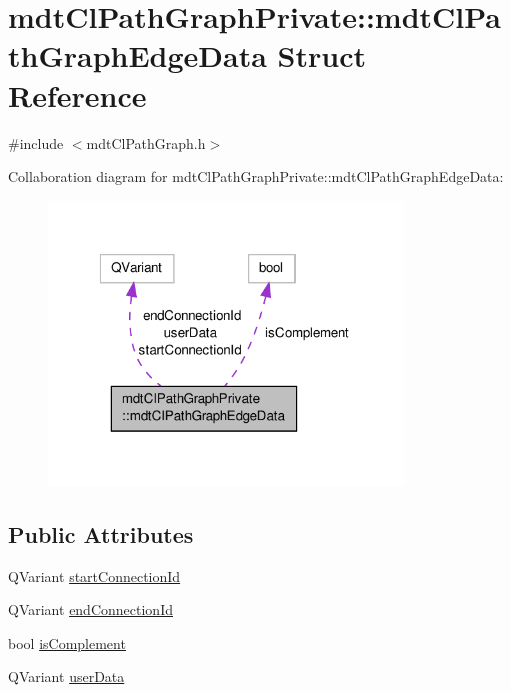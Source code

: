 \hypertarget{structmdt_cl_path_graph_private_1_1mdt_cl_path_graph_edge_data}{\section{mdt\-Cl\-Path\-Graph\-Private\-:\-:mdt\-Cl\-Path\-Graph\-Edge\-Data Struct Reference}
\label{structmdt_cl_path_graph_private_1_1mdt_cl_path_graph_edge_data}
}


{\ttfamily \#include $<$mdt\-Cl\-Path\-Graph.\-h$>$}



Collaboration diagram for mdt\-Cl\-Path\-Graph\-Private\-:\-:mdt\-Cl\-Path\-Graph\-Edge\-Data\-:
\nopagebreak
\begin{figure}[H]
\begin{center}
\leavevmode
\includegraphics[width=267pt]{structmdt_cl_path_graph_private_1_1mdt_cl_path_graph_edge_data__coll__graph}
\end{center}
\end{figure}
\subsection*{Public Attributes}
\begin{DoxyCompactItemize}
\item 
Q\-Variant \hyperlink{structmdt_cl_path_graph_private_1_1mdt_cl_path_graph_edge_data_a4d17d73e0bbc09b541b91a9ca1cad8da}{start\-Connection\-Id}
\item 
Q\-Variant \hyperlink{structmdt_cl_path_graph_private_1_1mdt_cl_path_graph_edge_data_a6dfdd2c68bdec4556ab367517737b7a1}{end\-Connection\-Id}
\item 
bool \hyperlink{structmdt_cl_path_graph_private_1_1mdt_cl_path_graph_edge_data_a423302ffa14fedbb80f362f9f44960d7}{is\-Complement}
\item 
Q\-Variant \hyperlink{structmdt_cl_path_graph_private_1_1mdt_cl_path_graph_edge_data_a64c472d1739bbf6deed62f2e96d01f55}{user\-Data}
\end{DoxyCompactItemize}



